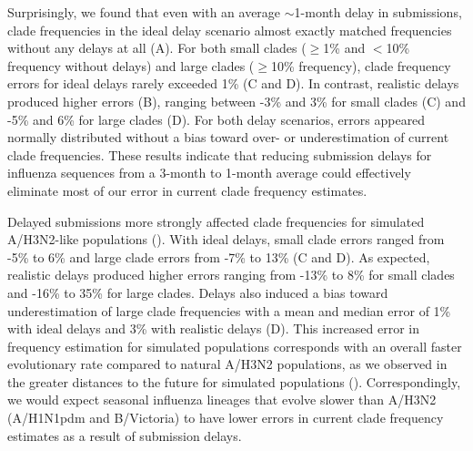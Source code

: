 \documentclass[9pt,lineno]{elife}
\begin{document}
\begin{figure}[htb]
%
\label{figdata:h3n2_tip_attributes}
\label{figsrccode:current_clade_frequency_errors}
\end{figure}

Surprisingly, we found that even with an average $\sim$1-month delay in submissions, clade frequencies in the ideal delay scenario almost exactly matched frequencies without any delays at all (A).
For both small clades ($\ge$1\% and $<$10\% frequency without delays) and large clades ($\ge$10\% frequency), clade frequency errors for ideal delays rarely exceeded 1\% (C and D).
In contrast, realistic delays produced higher errors (B), ranging between -3\% and 3\% for small clades (C) and -5\% and 6\% for large clades (D).
For both delay scenarios, errors appeared normally distributed without a bias toward over- or underestimation of current clade frequencies.
These results indicate that reducing submission delays for influenza sequences from a 3-month to 1-month average could effectively eliminate most of our error in current clade frequency estimates.

Delayed submissions more strongly affected clade frequencies for simulated A/H3N2-like populations ().
With ideal delays, small clade errors ranged from -5\% to 6\% and large clade errors from -7\% to 13\% (C and D).
As expected, realistic delays produced higher errors ranging from -13\% to 8\% for small clades and -16\% to 35\% for large clades.
Delays also induced a bias toward underestimation of large clade frequencies with a mean and median error of 1\% with ideal delays and 3\% with realistic delays (D).
This increased error in frequency estimation for simulated populations corresponds with an overall faster evolutionary rate compared to natural A/H3N2 populations, as we observed in the greater distances to the future for simulated populations ().
Correspondingly, we would expect seasonal influenza lineages that evolve slower than A/H3N2 (A/H1N1pdm and B/Victoria) to have lower errors in current clade frequency estimates as a result of submission delays.
\end{document}
